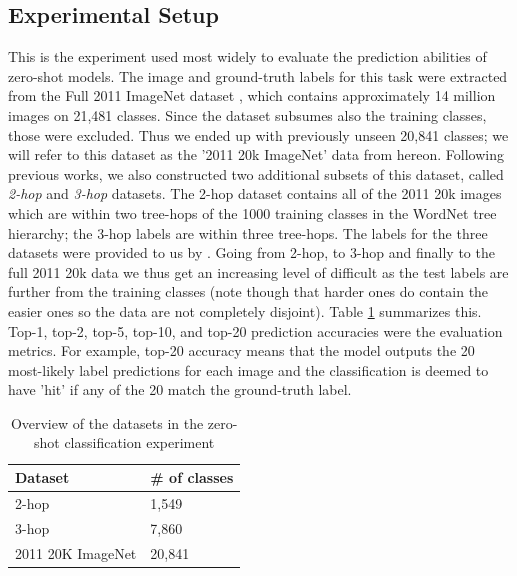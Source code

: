 \documentclass[12pt]{report}
\begin{document}
\subsection{Experimental Setup}
This is the experiment used most widely to evaluate the prediction abilities of zero-shot models. The image and ground-truth labels for this task were extracted from the Full 2011 ImageNet dataset \cite{JiaDeng2009}, which contains approximately 14 million images on 21,481 classes. Since the dataset subsumes also the training classes, those were excluded. Thus we ended up with previously unseen 20,841 classes; we will refer to this dataset as the '2011 20k ImageNet' data from hereon. Following previous works, we also constructed two additional subsets of this dataset, called \textit{2-hop} and \textit{3-hop} datasets. The 2-hop dataset contains all of the 2011 20k images which are within two tree-hops of the 1000 training classes in the WordNet tree hierarchy; the 3-hop labels are within three tree-hops. The labels for the three datasets were provided to us by \cite{Norouzi2013}. Going from 2-hop, to 3-hop and finally to the full 2011 20k data we thus get an increasing level of difficult as the test labels are further from the training classes (note though that harder ones do contain the easier ones so the data are not completely disjoint). Table \ref{tbl:zsldata} summarizes this. Top-1, top-2, top-5, top-10, and top-20 prediction accuracies were the evaluation metrics. For example, top-20 accuracy means that the model outputs the 20 most-likely label predictions for each image and the classification is deemed to have 'hit' if any of the 20 match the ground-truth label.
\begin{table}
\centering
\begin{tabular}{|l|l|}
\hline
\textbf{Dataset}  & \textbf{\# of classes} \\ \hline
2-hop             & 1,549                  \\
3-hop             & 7,860                  \\
2011 20K ImageNet & 20,841                 \\ \hline
\end{tabular}
\caption{Overview of the datasets in the zero-shot classification experiment}
\label{tbl:zsldata}
\end{table}
\end{document}
